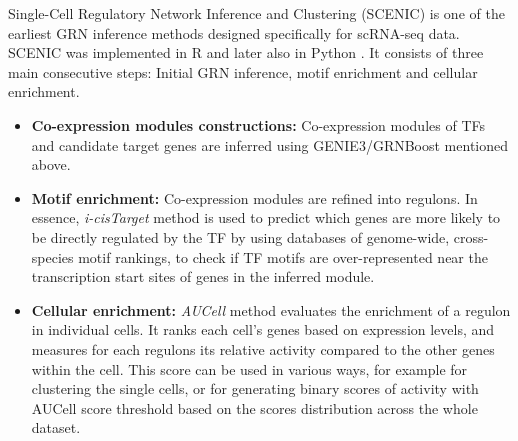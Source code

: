 
Single-Cell Regulatory Network Inference and Clustering (SCENIC)\cite{aibar2017scenic} is one of the earliest GRN inference 
methods designed specifically for scRNA-seq data. SCENIC was implemented in R \cite{aibar2017scenic} and later also in 
Python \cite{van2020scalable}.%
It consists of three main consecutive steps: Initial GRN inference, motif enrichment and cellular enrichment. 
\begin{itemize}
    \item \textbf{Co-expression modules constructions:} Co-expression modules of TFs and candidate target genes are inferred 
        using GENIE3/GRNBoost mentioned above.
    \item \textbf{Motif enrichment:}  Co-expression modules are refined into regulons. In essence, \textit{i-cisTarget} 
        method \cite{herrmann2012cistarget} is used to predict which genes are more likely to be directly regulated by the 
        TF by using databases of genome-wide, cross-species motif rankings, to check if TF motifs are over-represented near 
        the transcription start sites of genes in the inferred module. 
    \item \textbf{Cellular enrichment:} \textit{AUCell} method \cite{aibar2017scenic} evaluates the enrichment of a regulon 
        in individual cells. It ranks each cell's genes based on expression levels, and measures for each regulons its relative 
        activity compared to the other genes within the cell. This score can be used in various ways, for example for 
        clustering the single cells, or for generating binary scores of activity with AUCell score threshold based on the 
        scores distribution across the whole dataset. 
\end{itemize}

